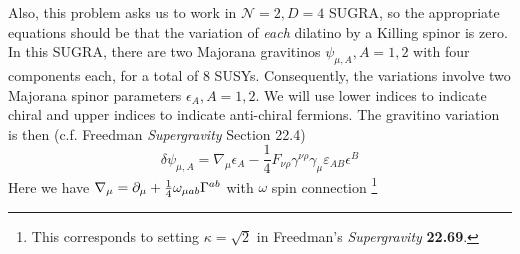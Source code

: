 \documentclass[11pt, class=article, crop=false]{standalone}
\begin{document}
\begin{enumerate}
	Also, this problem asks us to work in $\mathcal N =2, D = 4$ SUGRA, so the appropriate equations should be that the variation of \emph{each} dilatino by a Killing spinor is zero. In this SUGRA, there are two Majorana gravitinos $
\psi_{\mu, A}, A=1,2$ with four components each, for a total of $8$ SUSYs. Consequently, the variations involve two Majorana spinor parameters $\epsilon_{A}, A=1,2$. We will use lower indices to indicate chiral and upper indices to indicate anti-chiral fermions. The gravitino variation is then (c.f. Freedman \emph{Supergravity} Section 22.4)
\begin{equation}\label{eq:SUSYvar}
		\delta \psi_{\mu, A} = \nabla_\mu \epsilon_A - \frac14 F_{\nu \rho} \gamma^{\nu \rho} \gamma_\mu \varepsilon_{AB} \epsilon^B
\end{equation}
	Here we have $\nabla_\mu = \partial_\mu + \frac14 \omega_{\mu ab} \Gamma^{ab}$ with $\omega$ spin connection \footnote{This corresponds to setting $\kappa = \sqrt 2$ in Freedman's \emph{Supergravity} \textbf{22.69}.}


\end{enumerate}
\end{document}
